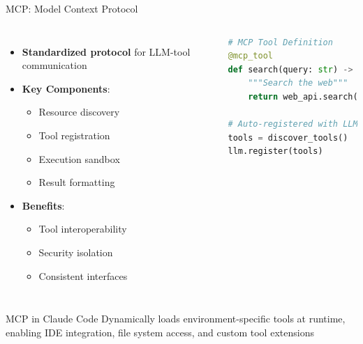 \documentclass[aspectratio=169]{beamer}
\begin{document}
\begin{frame}[fragile]{MCP: Model Context Protocol}
	\begin{columns}
		\begin{itemize}
			\item {\color{highlight}\textbf{Standardized protocol}} for LLM-tool communication
			\item {\color{highlight}\textbf{Key Components}}:
			\begin{itemize}
				\item Resource discovery
				\item Tool registration
				\item Execution sandbox
				\item Result formatting
			\end{itemize}
			\item {\color{highlight}\textbf{Benefits}}:
			\begin{itemize}
				\item Tool interoperability
				\item Security isolation
				\item Consistent interfaces
			\end{itemize}
		\end{itemize}
		
		\begin{lstlisting}[language=python, basicstyle=\tiny]
# MCP Tool Definition
@mcp_tool
def search(query: str) -> str:
    """Search the web"""
    return web_api.search(query)

# Auto-registered with LLM
tools = discover_tools()
llm.register(tools)
		\end{lstlisting}
	\end{columns}
	
	\vspace{0.3cm}
	\begin{block}{MCP in Claude Code}
		Dynamically loads environment-specific tools at runtime, enabling IDE integration, file system access, and custom tool extensions
	\end{block}
\end{frame}
\end{document}

